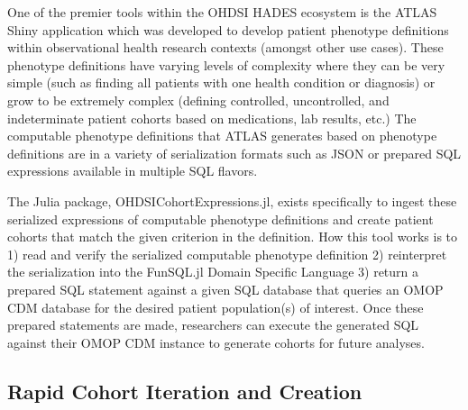 \documentclass{juliacon}
\begin{document}

One of the premier tools within the OHDSI HADES ecosystem is the ATLAS Shiny application which was developed to develop patient phenotype definitions within observational health research contexts (amongst other use cases).
These phenotype definitions have varying levels of complexity where they can be very simple (such as finding all patients with one health condition or diagnosis) or grow to be extremely complex (defining controlled, uncontrolled, and indeterminate patient cohorts based on medications, lab results, etc.)
The computable phenotype definitions that ATLAS generates based on phenotype definitions are in a variety of serialization formats such as JSON or prepared SQL expressions available in multiple SQL flavors.

The Julia package, OHDSICohortExpressions.jl, exists specifically to ingest these serialized expressions of computable phenotype definitions and create patient cohorts that match the given criterion in the definition.
How this tool works is to 1) read and verify the serialized computable phenotype definition 2) reinterpret the serialization into the FunSQL.jl Domain Specific Language 3) return a prepared SQL statement against a given SQL database that queries an OMOP CDM database for the desired patient population(s) of interest.
Once these prepared statements are made, researchers can execute the generated SQL against their OMOP CDM instance to generate cohorts for future analyses.

\subsection{Rapid Cohort Iteration and Creation}
\end{document}
